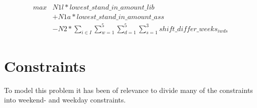 \begin{equation*}
\begin{aligned}
max &  N1l*lowest\_stand\_in\_amount\_lib\\
 & + N1a*lowest\_stand\_in\_amount\_ass \\
 & - N2*\sum_{i \in I}\sum_{w = 1}^{5}\sum_{d = 1}^{5}\sum_{s = 1}^{3} shift\_differ\_weeks_{iwds}
\end{aligned}
\end{equation*}


\section{Constraints}
To model this problem it has been of relevance to divide many of the constraints into weekend- and weekday constraints. 